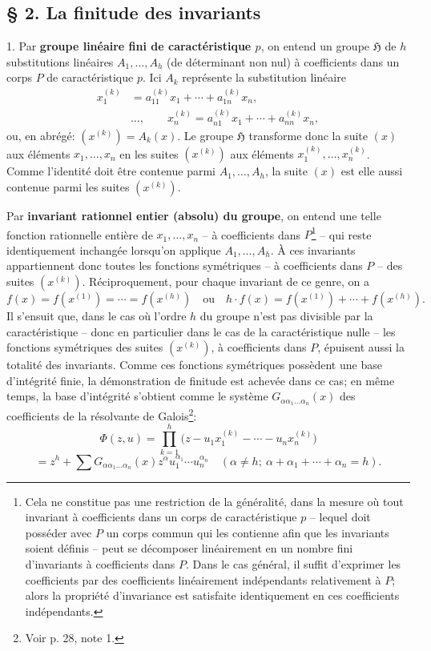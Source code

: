 \subsection*{\S{} 2. La finitude des invariants}

1. Par \textbf{groupe linéaire fini de caractéristique $p$}, on entend un groupe $\mathfrak H$ de $h$ substitutions linéaires $A_1,\ldots,A_h$ (de déterminant non nul) à coefficients dans un corps $P$ de caractéristique $p$. Ici $A_k$ représente la substitution linéaire
\[
\begin{aligned}
 x_1^{(k)}&=a_{11}^{(k)}x_1+\cdots+a_{1n}^{(k)}x_n,\\[-0.2em]
 &\ldots,\qquad
 x_n^{(k)}=a_{n1}^{(k)}x_1+\cdots+a_{nn}^{(k)}x_n,
\end{aligned}
\]
ou, en abrégé: $(x^{(k)})=A_k(x)$. Le groupe $\mathfrak H$ transforme donc la suite $(x)$ aux éléments $x_1,\ldots,x_n$ en les suites $(x^{(k)})$ aux éléments $x_1^{(k)},\ldots,x_n^{(k)}$. Comme l'identité doit être contenue parmi $A_1,\ldots,A_h$, la suite $(x)$ est elle aussi contenue parmi les suites $(x^{(k)})$.

Par \textbf{invariant rationnel entier (absolu) du groupe}, on entend une telle fonction rationnelle entière de $x_1,\ldots,x_n$ -- à coefficients dans $P$\footnote{Cela ne constitue pas une restriction de la généralité, dans la mesure où tout invariant à coefficients dans un corps de caractéristique $p$ -- lequel doit posséder avec $P$ un corps commun qui les contienne afin que les invariants soient définis -- peut se décomposer linéairement en un nombre fini d'invariants à coefficients dans $P$. Dans le cas général, il suffit d'exprimer les coefficients par des coefficients linéairement indépendants relativement à $P$; alors la propriété d'invariance est satisfaite identiquement en ces coefficients indépendants.} -- qui reste identiquement inchangée lorsqu'on applique $A_1,\ldots,A_h$. À ces invariants appartiennent donc toutes les fonctions symétriques -- à coefficients dans $P$ -- des suites $(x^{(k)})$. Réciproquement, pour chaque invariant de ce genre, on a
\[
 f(x)=f(x^{(1)})=\cdots=f(x^{(h)})
 \quad\text{ou}\quad
 h\cdot f(x)=f(x^{(1)})+\cdots+f(x^{(h)}).
\]
Il s'ensuit que, dans le cas où l'ordre $h$ du groupe n'est pas divisible par la caractéristique -- donc en particulier dans le cas de la caractéristique nulle -- les fonctions symétriques des suites $(x^{(k)})$, à coefficients dans $P$, épuisent aussi la totalité des invariants. Comme ces fonctions symétriques possèdent une base d'intégrité finie, la démonstration de finitude est achevée dans ce cas; en même temps, la base d'intégrité s'obtient comme le système $G_{\alpha\alpha_1\ldots\alpha_n}(x)$ des coefficients de la résolvante de Galois\footnote{Voir p. 28, note 1.}:
\[
 \Phi(z,u)=\prod_{k=1}^{h}\bigl(z-u_1x_1^{(k)}-\cdots-u_nx_n^{(k)}\bigr)
\]
\[
 =z^h+\sum G_{\alpha\alpha_1\ldots\alpha_n}(x)
 z^{\alpha}u_1^{\alpha_1}\cdots u_n^{\alpha_n}
 \quad(\alpha\ne h;\ \alpha+\alpha_1+\cdots+\alpha_n=h).
\]

